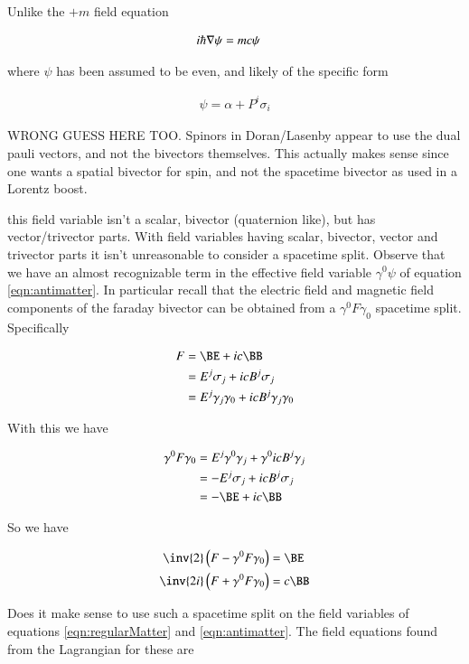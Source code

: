 \documentclass{article}
\begin{document}
Unlike the $+m$ field equation

\begin{align}\label{eqn:regularMatter}
i \hbar \nabla \psi &= m c \psi
\end{align}

where $\psi$ has been assumed to be even, and likely of the specific form

\begin{align*}
\psi = \alpha + P^i \sigma_i
\end{align*}

WRONG GUESS HERE TOO.  Spinors in Doran/Lasenby appear to use the dual pauli vectors, and not the bivectors themselves.  This actually makes sense since one wants a spatial bivector for spin, and not the spacetime bivector as used in a Lorentz boost.

this field variable isn't a scalar, bivector (quaternion like), but has vector/trivector parts.  With field variables having scalar, bivector, vector and trivector parts it isn't unreasonable to consider a spacetime split.  Observe that we have an almost recognizable term in the effective field variable $\gamma^0 \psi$ of
equation \ref{eqn:antimatter}.  In particular recall that the electric field and magnetic field components of the faraday bivector can be obtained from a 
$\gamma^0 F \gamma_0$ spacetime split.  Specifically

\begin{align*}
F 
&= \BE + i c \BB \\
&= E^j \sigma_j + i c B^j \sigma_j \\
&= E^j \gamma_j \gamma_0 + i c B^j \gamma_j \gamma_0 \\
\end{align*}

With this we have

\begin{align*}
\gamma^0 F \gamma_0
&= E^j \gamma^0 \gamma_j + \gamma^0 i c B^j \gamma_j \\
&= -E^j \sigma_j + i c B^j \sigma_j \\
&= -\BE + i c \BB
\end{align*}

So we have

\begin{align*}
\inv{2} \left(F - \gamma^0 F \gamma_0 \right) &= \BE \\
\inv{2i} \left(F + \gamma^0 F \gamma_0 \right) &= c \BB
\end{align*}

Does it make sense to use such a spacetime split on the field variables of equations \ref{eqn:regularMatter} and \ref{eqn:antimatter}.  The field equations
found from the Lagrangian for these are 
\end{document}
